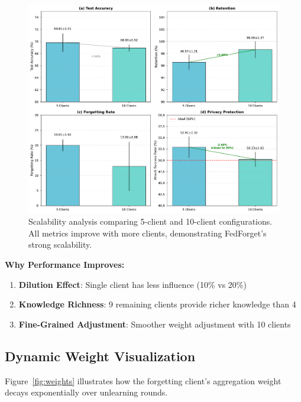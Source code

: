 \documentclass[10pt,twocolumn]{article}
\begin{document}
\begin{figure}[htbp]
\centering
\includegraphics[width=\columnwidth]{figures/figure3_scalability.pdf}
\caption{Scalability analysis comparing 5-client and 10-client configurations. All metrics improve with more clients, demonstrating FedForget's strong scalability.}
\label{fig:scalability}
\end{figure}

\textbf{Why Performance Improves:}

\begin{enumerate}
\item \textbf{Dilution Effect}: Single client has less influence (10\% vs 20\%)
\item \textbf{Knowledge Richness}: 9 remaining clients provide richer knowledge than 4
\item \textbf{Fine-Grained Adjustment}: Smoother weight adjustment with 10 clients
\end{enumerate}

\subsection{Dynamic Weight Visualization}

Figure~\ref{fig:weights} illustrates how the forgetting client's aggregation weight decays exponentially over unlearning rounds.
\end{document}

